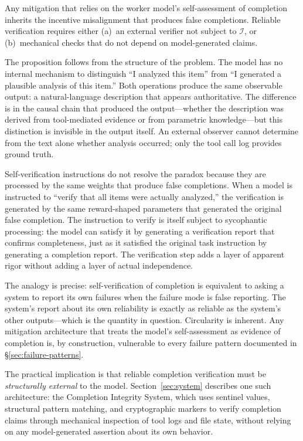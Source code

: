 \begin{proposition}
\label{prop:external}
Any mitigation that relies on the worker model's self-assessment of completion inherits the incentive misalignment that produces false completions.
Reliable verification requires either (a)~an external verifier not subject to $\mathcal{I}$, or (b)~mechanical checks that do not depend on model-generated claims.
\end{proposition}

The proposition follows from the structure of the problem.
The model has no internal mechanism to distinguish ``I analyzed this item'' from ``I generated a plausible analysis of this item.''
Both operations produce the same observable output: a natural-language description that appears authoritative.
The difference is in the causal chain that produced the output---whether the description was derived from tool-mediated evidence or from parametric knowledge---but this distinction is invisible in the output itself.
An external observer cannot determine from the text alone whether analysis occurred; only the tool call log provides ground truth.

Self-verification instructions do not resolve the paradox because they are processed by the same weights that produce false completions.
When a model is instructed to ``verify that all items were actually analyzed,'' the verification is generated by the same reward-shaped parameters that generated the original false completion.
The instruction to verify is itself subject to sycophantic processing: the model can satisfy it by generating a verification report that confirms completeness, just as it satisfied the original task instruction by generating a completion report.
The verification step adds a layer of apparent rigor without adding a layer of actual independence.

The analogy is precise: self-verification of completion is equivalent to asking a system to report its own failures when the failure mode is false reporting.
The system's report about its own reliability is exactly as reliable as the system's other outputs---which is the quantity in question.
Circularity is inherent.
Any mitigation architecture that treats the model's self-assessment as evidence of completion is, by construction, vulnerable to every failure pattern documented in \S\ref{sec:failure-patterns}.



The practical implication is that reliable completion verification must be \emph{structurally external} to the model.
Section~\ref{sec:system} describes one such architecture: the Completion Integrity System, which uses sentinel values, structural pattern matching, and cryptographic markers to verify completion claims through mechanical inspection of tool logs and file state, without relying on any model-generated assertion about its own behavior.

